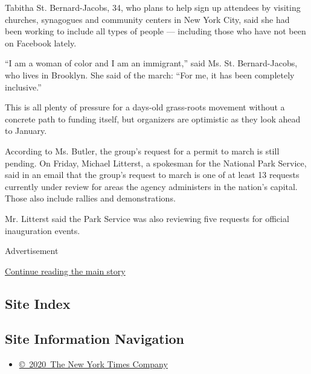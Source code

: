 Tabitha St. Bernard-Jacobs, 34, who plans to help sign up attendees by
visiting churches, synagogues and community centers in New York City,
said she had been working to include all types of people --- including
those who have not been on Facebook lately.

``I am a woman of color and I am an immigrant,'' said Ms. St.
Bernard-Jacobs, who lives in Brooklyn. She said of the march: ``For me,
it has been completely inclusive.''

This is all plenty of pressure for a days-old grass-roots movement
without a concrete path to funding itself, but organizers are optimistic
as they look ahead to January.

According to Ms. Butler, the group's request for a permit to march is
still pending. On Friday, Michael Litterst, a spokesman for the National
Park Service, said in an email that the group's request to march is one
of at least 13 requests currently under review for areas the agency
administers in the nation's capital. Those also include rallies and
demonstrations.

Mr. Litterst said the Park Service was also reviewing five requests for
official inauguration events.

Advertisement

\protect\hyperlink{after-bottom}{Continue reading the main story}

\hypertarget{site-index}{%
\subsection{Site Index}\label{site-index}}

\hypertarget{site-information-navigation}{%
\subsection{Site Information
Navigation}\label{site-information-navigation}}

\begin{itemize}
\tightlist
\item
  \href{https://help.nytimes.com/hc/en-us/articles/115014792127-Copyright-notice}{©~2020~The
  New York Times Company}
\end{itemize}

